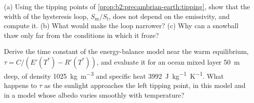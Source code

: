 \begin{exercise}[$\star\star\star$]\label{exo:b2:precambrian-earth:11}
(a) Using the tipping points of \cref{prop:b2:precambrian-earth:tipping}, show that the width
of the hysteresis loop, $S_{\text{m}}/S_{\text{f}}$, does not depend on the emissivity, and
compute it. (b) What would make the loop narrower? (c) Why can a snowball thaw only far from
the conditions in which it froze?
\end{exercise}

\begin{exercise}[$\star\star\star$]\label{exo:b2:precambrian-earth:12}
Derive the time constant of the energy-balance model near the warm equilibrium, $\tau =
C/(E'(T^*) - R'(T^*))$, and evaluate it for an ocean mixed layer \qty{50}{m} deep, of density
\qty{1025}{kg.m^{-3}} and specific heat \qty{3992}{J.kg^{-1}.K^{-1}}. What happens to $\tau$ as the
sunlight approaches the left tipping point, in this model and in a model whose albedo varies
smoothly with temperature?
\end{exercise}

